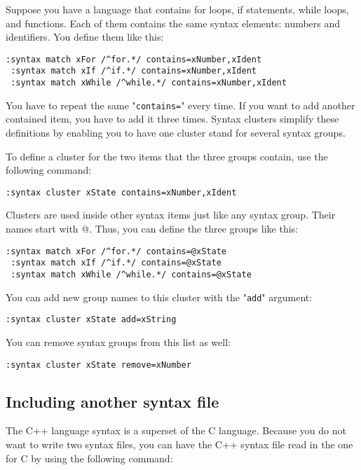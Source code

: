 Suppose you have a language that contains for loops, if statements, while loops, and functions.
Each of them contains the same syntax elements: numbers and identifiers.
You define them like this:

\begin{Verbatim}[samepage=true]
 :syntax match xFor /^for.*/ contains=xNumber,xIdent
 :syntax match xIf /^if.*/ contains=xNumber,xIdent
 :syntax match xWhile /^while.*/ contains=xNumber,xIdent
\end{Verbatim}

You have to repeat the same "\texttt{contains=}" every time.
If you want to add another contained item, you have to add it three times.
Syntax clusters simplify these definitions by enabling you to have one cluster stand for several syntax groups.

To define a cluster for the two items that the three groups contain, use the following command:

\begin{Verbatim}[samepage=true]
 :syntax cluster xState contains=xNumber,xIdent
\end{Verbatim}

Clusters are used inside other syntax items just like any syntax group.
Their names start with @.
Thus, you can define the three groups like this:

\begin{Verbatim}[samepage=true]
 :syntax match xFor /^for.*/ contains=@xState
 :syntax match xIf /^if.*/ contains=@xState
 :syntax match xWhile /^while.*/ contains=@xState
\end{Verbatim}

You can add new group names to this cluster with the "\texttt{add}" argument:

\begin{Verbatim}[samepage=true]
 :syntax cluster xState add=xString
\end{Verbatim}

You can remove syntax groups from this list as well:

\begin{Verbatim}[samepage=true]
 :syntax cluster xState remove=xNumber
\end{Verbatim}

\subsection{Including another syntax file}
The C++ language syntax is a superset of the C language.
Because you do not want to write two syntax files, you can have the C++ syntax file read in the one for C by using the following command:

